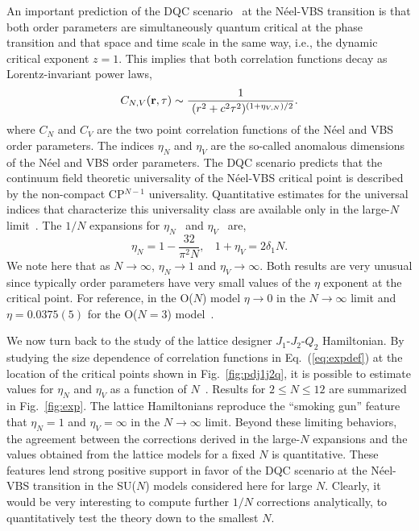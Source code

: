 \documentclass[range]{ar2e}
\begin{document}
An important prediction of the DQC scenario~\cite{Senthil04a} at the N\'eel-VBS transition is that both order parameters are
simultaneously quantum critical at the phase transition and that space and time scale in the same way, i.e., the dynamic critical 
exponent $z=1$. This implies that both correlation functions decay as Lorentz-invariant power laws,
\begin{equation}
\label{eq:expdef}
C_{N,V} ({\bf r},\tau) \sim  \frac{1}{~(r^2+c^2\tau^2)^{(1+\eta_{V,N})/2}}.
\end{equation}
 where $C_N$ and $C_V$ are the two point correlation functions of the
 N\'eel and VBS order parameters. The indices $\eta_N$ and $\eta_V$
 are the so-called anomalous dimensions of the N\'eel and VBS order
 parameters. The DQC scenario predicts that
 the continuum field theoretic universality of the N\'eel-VBS critical
 point is described by the non-compact CP$^{N-1}$ universality. Quantitative
 estimates for the universal indices that characterize this
 universality class are available only in the large-$N$
 limit~\cite{halperin1974:largeN}. The ${1}/{N}$ expansions for $\eta_N$~\cite{kaul2008:u1} and $\eta_V$~\cite{murthy1990:mono,metlitski2008:mono} are,
\begin{equation}
\label{eq:oneonN}
\eta_N = 1 - \frac{32}{\pi^2N},~~~~
1+\eta_V = 2 \delta_1 N.
\end{equation}
We note here that as $N\rightarrow\infty$, $\eta_N \rightarrow 1$ and
$\eta_V\rightarrow \infty$. Both results are very unusual since
typically order parameters have very small values of the $\eta$
exponent at the critical point. For reference, in the O($N$) model $\eta\rightarrow
0$ in the $N\rightarrow\infty$ limit and $\eta=0.0375(5)$ for the O($N=3$) model~\cite{campostrini2002:o3}.

We now turn back to the study of the lattice designer $J_1$-$J_2$-$Q_2$
Hamiltonian. By studying the size dependence of correlation functions in Eq.~(\ref{eq:expdef})
at the location of the critical points shown in Fig.~\ref{fig:pdj1j2q}, it is possible to
estimate values for $\eta_N$ and $\eta_V$ as a function
of $N$~\cite{lou2009:sun,kaul2011:j1j2}. Results for $2\leq N \leq 12$ are summarized in Fig.~\ref{fig:exp}. 
The lattice Hamiltonians reproduce the ``smoking gun'' feature that $\eta_N=1$ and $\eta_V=\infty$ in 
the $N\rightarrow \infty$ limit. Beyond these limiting behaviors, the agreement between the corrections
derived in the large-$N$ expansions and the values obtained from the lattice models for a fixed $N$ is quantitative. 
These features lend strong positive support in favor of the DQC scenario at the N\'eel-VBS transition in 
the SU($N$) models considered here for large $N$. Clearly, it would be very interesting to compute further $1/N$ 
corrections analytically, to quantitatively test the theory down to the smallest $N$.
\end{document}
